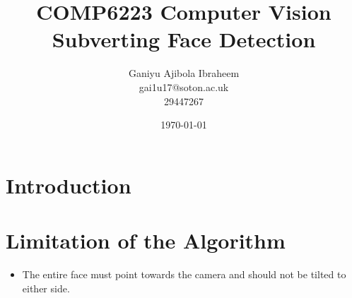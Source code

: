 \documentclass[a4paper,12pt]{article}
\begin{document}
	
\begin{titlepage}
	\title{
		COMP6223 Computer Vision \\
		\large Subverting Face Detection
	}
	\date{\today}
	\author{
		Ganiyu Ajibola Ibraheem \\
		\large gai1u17@soton.ac.uk \\
			29447267
	}
\end{titlepage}

\maketitle
\newpage
{}
\tableofcontents
\newpage
\listoffigures

\listoflistings
\newpage
{}


\section{Introduction}

\section{Limitation of the Algorithm}
	\begin{itemize}
		\item The entire face must point towards the camera and should not be tilted to either side.
	\end{itemize}
\end{document}
